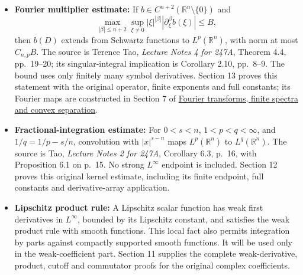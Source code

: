 \documentclass[
  11pt,
]{article}
\begin{document}
\begin{itemize}
  continuity and convergence of smooth approximate identities in these
  spaces. Locally, smooth approximation holds in integer \(W^{s,p}\). A
  distribution represented by an \(L^p\) limit has the corresponding
  distributional derivatives. These are the integration and
  weak-derivative facts used below. Sections 15.1--15.5 of
  \href{banach-foundation-bridges.pdf}{Banach estimates, quotient spaces
  and compact parameter arguments} prove these operations with their
  full norms, scale factors and derivative signs, and identify their
  exact applications below.
\item
  \textbf{Fourier multiplier estimate:} If
  \(b\in C^{n+2}(\mathbb R^n\setminus\{0\})\) and \[
  \max_{|\beta|\leq n+2}\sup_{\xi\ne0}
  |\xi|^{|\beta|}|\partial_\xi^\beta b(\xi)|\leq B,
  \] then \(b(D)\) extends from Schwartz functions to
  \(L^p(\mathbb R^n)\), with norm at most \(C_{n,p}B\). The source is
  Terence Tao, \emph{Lecture Notes 4 for 247A}, Theorem 4.4, pp.~19--20;
  its singular-integral implication is Corollary 2.10, pp.~8--9. The
  bound uses only finitely many symbol derivatives. Section 13 proves
  this statement with the original operator, finite exponents and full
  constants; its Fourier maps are constructed in Section 7 of
  \href{prerequisite-bridges.pdf}{Fourier transforms, finite spectra and
  convex separation}.
\item
  \textbf{Fractional-integration estimate:} For \(0<s<n\),
  \(1<p<q<\infty\), and \(1/q=1/p-s/n\), convolution with \(|x|^{s-n}\)
  maps \(L^p(\mathbb R^n)\) to \(L^q(\mathbb R^n)\). The source is Tao,
  \emph{Lecture Notes 2 for 247A}, Corollary 6.3, p.~16, with
  Proposition 6.1 on p.~15. No strong \(L^\infty\) endpoint is included.
  Section 12 proves this original kernel estimate, including its finite
  endpoint, full constants and derivative-array application.
\item
  \textbf{Lipschitz product rule:} A Lipschitz scalar function has weak
  first derivatives in \(L^\infty\), bounded by its Lipschitz constant,
  and satisfies the weak product rule with smooth functions. This local
  fact also permits integration by parts against compactly supported
  smooth functions. It will be used only in the weak-coefficient part.
  Section 11 supplies the complete weak-derivative, product, cutoff and
  commutator proofs for the original complex coefficients.
\end{itemize}
\end{document}

